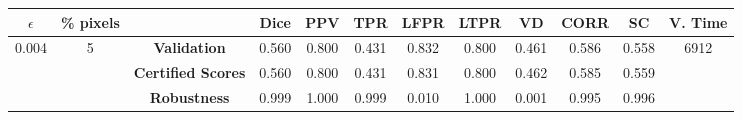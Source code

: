 \begin{longtable}{ c  c | c | c  c  c  c  c  c  c c c}
\toprule \textbf{$\epsilon$} & \textbf{\% pixels} & & \textbf{Dice} & \textbf{PPV} & \textbf{TPR} & \textbf{LFPR} & \textbf{LTPR} & \textbf{VD} & \textbf{CORR} & \textbf{SC} & \textbf{V. Time} \\
\midrule 
\multirow{3}{*}{0.004}  & \multirow{3}{*}{5} &\textbf{Validation} & 0.560 & 0.800 & 0.431 & 0.832 & 0.800 & 0.461 & 0.586 & 0.558 & \multirow{3}{*}{6912} \\
 & & \textbf{Certified Scores} & 0.560 & 0.800 & 0.431 & 0.831 & 0.800 & 0.462 & 0.585 & 0.559 & \\
& & \textbf{Robustness} & 0.999 & 1.000 & 0.999 & 0.010 & 1.000 & 0.001 & 0.995 & 0.996 & \\
\end{longtable}